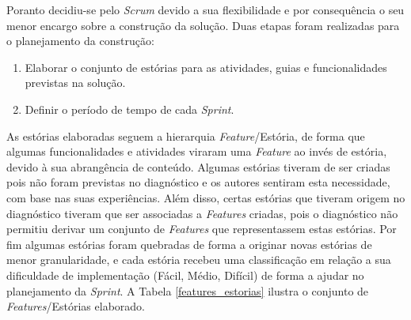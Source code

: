 Poranto decidiu-se pelo \textit{Scrum} devido a sua flexibilidade e por consequência o seu menor encargo sobre a construção da solução. Duas etapas foram realizadas para o planejamento da construção:

\begin{enumerate}
\item Elaborar o conjunto de estórias para as atividades, guias e funcionalidades previstas na solução.
\item Definir o período de tempo de cada \textit{Sprint}.
\end{enumerate}

As estórias elaboradas seguem a hierarquia \textit{Feature}/Estória, de forma que algumas funcionalidades e atividades viraram uma \textit{Feature} ao invés de estória, devido à sua abrangência de conteúdo. Algumas estórias tiveram de ser criadas pois não foram previstas no diagnóstico e os autores sentiram esta necessidade, com base nas suas experiências. Além disso, certas estórias que tiveram origem no diagnóstico tiveram que ser associadas a \textit{Features} criadas, pois o diagnóstico não permitiu derivar um conjunto de \textit{Features} que representassem estas estórias. Por fim algumas estórias foram quebradas de forma a originar novas estórias de menor granularidade, e cada estória recebeu uma classificação em relação a sua dificuldade de implementação (Fácil, Médio, Difícil) de forma a ajudar no planejamento da \textit{Sprint}. A Tabela \ref{features_estorias} ilustra o conjunto de \textit{Features}/Estórias elaborado.

